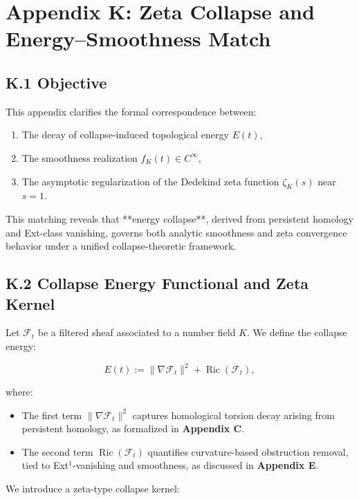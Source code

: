 \documentclass[11pt]{article}
\begin{document}
\section*{Appendix K: Zeta Collapse and Energy–Smoothness Match}

\subsection*{K.1 Objective}

This appendix clarifies the formal correspondence between:

\begin{enumerate}
  \item The decay of collapse-induced topological energy $E(t)$,
  \item The smoothness realization $f_K(t) \in C^\infty$,
  \item The asymptotic regularization of the Dedekind zeta function $\zeta_K(s)$ near $s = 1$.
\end{enumerate}

This matching reveals that **energy collapse**, derived from persistent homology and Ext-class vanishing, governs both analytic smoothness and zeta convergence behavior under a unified collapse-theoretic framework.

\subsection*{K.2 Collapse Energy Functional and Zeta Kernel}

Let $\mathcal{F}_t$ be a filtered sheaf associated to a number field $K$.  
We define the collapse energy:

\[
E(t) := \|\nabla \mathcal{F}_t\|^2 + \operatorname{Ric}(\mathcal{F}_t),
\]

where:
\begin{itemize}
  \item The first term $\|\nabla \mathcal{F}_t\|^2$ captures homological torsion decay arising from persistent homology, as formalized in \textbf{Appendix C}.
  \item The second term $\operatorname{Ric}(\mathcal{F}_t)$ quantifies curvature-based obstruction removal, tied to Ext$^1$-vanishing and smoothness, as discussed in \textbf{Appendix E}.
\end{itemize}

We introduce a zeta-type collapse kernel:
\end{document}
